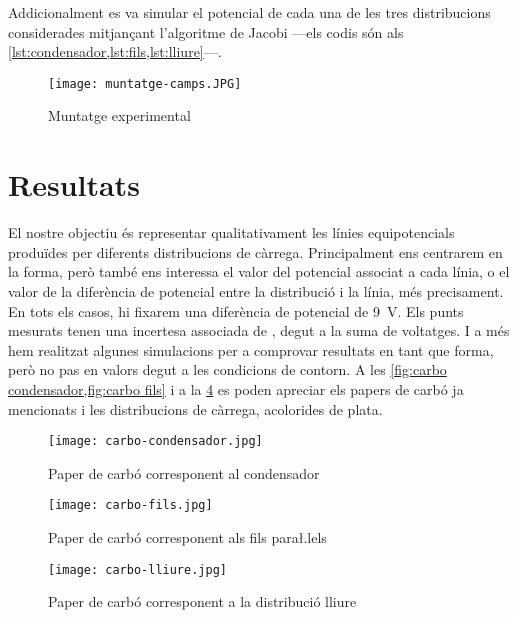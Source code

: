 Addicionalment es va simular el potencial de cada una de les tres distribucions considerades mitjançant l'algoritme de Jacobi ---els codis són als \cref{lst:condensador,lst:fils,lst:lliure}---.

\begin{figure}[htb]
	\centering
	\texttt{[image: muntatge-camps.JPG]}
	\caption{Muntatge experimental}
	\label{fig:muntatge}
\end{figure}

\section{Resultats}
El nostre objectiu és representar qualitativament les línies equipotencials produïdes per diferents distribucions de càrrega. Principalment ens centrarem en la forma, però també ens interessa el valor del potencial associat a cada línia, o el valor de la diferència de potencial entre la distribució i la línia, més precisament. En tots els casos, hi fixarem una diferència de potencial de \SI{9}{V}. Els punts mesurats tenen una incertesa associada de , degut a la suma de voltatges. I a més hem realitzat algunes simulacions per a comprovar resultats en tant que forma, però no pas en valors degut a les condicions de contorn. A les \cref{fig:carbo condensador,fig:carbo fils} i a la \cref{fig:carbo lliure} es poden apreciar els papers de carbó ja mencionats i les distribucions de càrrega, acolorides de plata.

\begin{figure}[htb]
  \centering
	\texttt{[image: carbo-condensador.jpg]}
  \caption{Paper de carbó corresponent al condensador}
  \label{fig:carbo condensador}
\end{figure}

\begin{figure}[htb]
  \centering
	\texttt{[image: carbo-fils.jpg]}
  \caption{Paper de carbó corresponent als fils para\l.lels}
  \label{fig:carbo fils}
\end{figure}

\begin{figure}[htb]
  \centering
	\texttt{[image: carbo-lliure.jpg]}
  \caption{Paper de carbó corresponent a la distribució lliure}
  \label{fig:carbo lliure}
\end{figure}

